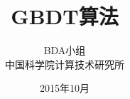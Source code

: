\documentclass[a4paper,11pt,         %
               ]{article}
\begin{document}
\newcommand{\song}{\CJKfamily{song}} %
\newcommand{\hei}{\CJKfamily{hei}}   %
\newcommand{\fs}{\CJKfamily{fs}}     %
\newcommand{\kai}{\CJKfamily{kai}}   %

\newtheorem{example}{例}             %
\newtheorem{theorem}{定理}[section]  %
\newtheorem{definition}{定义}
\newtheorem{axiom}{公理}
\newtheorem{property}{性质}
\newtheorem{proposition}{命题}
\newtheorem{lemma}{引理}
\newtheorem{corollary}{推论}
\newtheorem{remark}{注解}
\newtheorem{condition}{条件}
\newtheorem{conclusion}{结论}
\newtheorem{assumption}{假设}

\renewcommand{\contentsname}{目录}     %
\renewcommand{\abstractname}{摘\ \ 要} %
\renewcommand{\refname}{参考文献}      %
\renewcommand{\indexname}{索引}
\renewcommand{\figurename}{图}
\renewcommand{\tablename}{表}
\renewcommand{\appendixname}{附录}
\renewcommand{\proofname}{\hei 证明}

\newcommand{\yihao}{\fontsize{26pt}{36pt}\selectfont}       %
\newcommand{\erhao}{\fontsize{22pt}{28pt}\selectfont}       %
\newcommand{\xiaoer}{\fontsize{18pt}{18pt}\selectfont}      %
\newcommand{\sanhao}{\fontsize{16pt}{24pt}\selectfont}      %
\newcommand{\xiaosan}{\fontsize{15pt}{22pt}\selectfont}     %
\newcommand{\sihao}{\fontsize{14pt}{21pt}\selectfont}       %
\newcommand{\bansi}{\fontsize{13pt}{19.5pt}\selectfont}     %
\newcommand{\xiaosi}{\fontsize{12pt}{18pt}\selectfont}      %
\newcommand{\dawu}{\fontsize{11pt}{11pt}\selectfont}        %
\newcommand{\wuhao}{\fontsize{10.5pt}{10.5pt}\selectfont}   %

\newcommand{\tabincell}[2]{\begin{tabular}{@{}#1@{}}#2\end{tabular}}

\rfoot{~\thepage~}

\title{GBDT算法}
\author{BDA小组\\                     %
        中国科学院计算技术研究所}
\date{2015年10月}                %
\maketitle                           %
\end{document}
